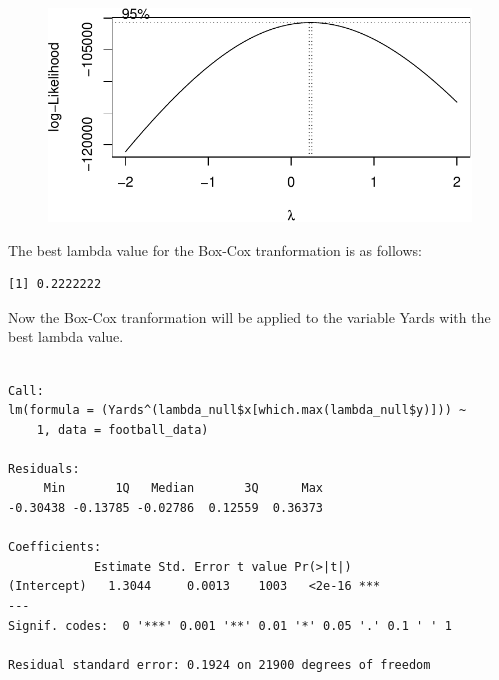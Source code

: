 \documentclass[
  super,
  preprint,
  3p]{elsarticle}
\newenvironment{Shaded}{\begin{snugshade}}{\end{snugshade}}
\newcommand{\AttributeTok}[1]{\textcolor[rgb]{0.40,0.45,0.13}{#1}}
\newcommand{\DecValTok}[1]{\textcolor[rgb]{0.68,0.00,0.00}{#1}}
\newcommand{\FunctionTok}[1]{\textcolor[rgb]{0.28,0.35,0.67}{#1}}
\newcommand{\NormalTok}[1]{\textcolor[rgb]{0.00,0.23,0.31}{#1}}
\newcommand{\OtherTok}[1]{\textcolor[rgb]{0.00,0.23,0.31}{#1}}
\newcommand{\SpecialCharTok}[1]{\textcolor[rgb]{0.37,0.37,0.37}{#1}}
\begin{document}
\begin{figure}[H]

{\centering \includegraphics{project_report_files/figure-pdf/unnamed-chunk-4-1.pdf}

}

\end{figure}

The best lambda value for the Box-Cox tranformation is as follows:

\begin{Shaded}
\end{Shaded}

\begin{verbatim}
[1] 0.2222222
\end{verbatim}

Now the Box-Cox tranformation will be applied to the variable Yards with
the best lambda value.

\begin{Shaded}
\end{Shaded}

\begin{verbatim}

Call:
lm(formula = (Yards^(lambda_null$x[which.max(lambda_null$y)])) ~ 
    1, data = football_data)

Residuals:
     Min       1Q   Median       3Q      Max 
-0.30438 -0.13785 -0.02786  0.12559  0.36373 

Coefficients:
            Estimate Std. Error t value Pr(>|t|)    
(Intercept)   1.3044     0.0013    1003   <2e-16 ***
---
Signif. codes:  0 '***' 0.001 '**' 0.01 '*' 0.05 '.' 0.1 ' ' 1

Residual standard error: 0.1924 on 21900 degrees of freedom
\end{verbatim}
\end{document}
